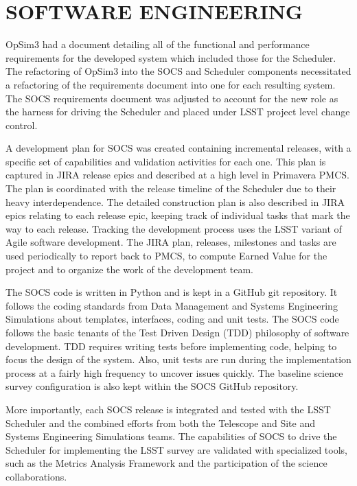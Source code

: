 \documentclass[]{spie}  %
\begin{document}
\section{SOFTWARE ENGINEERING}

OpSim3 had a document detailing all of the functional and performance requirements for the developed system which included those for the Scheduler. The refactoring of OpSim3 into the SOCS and Scheduler components necessitated a refactoring of the requirements document into one for each resulting system. The SOCS requirements document was adjusted to account for the new role as the harness for driving the Scheduler and placed under LSST project level change control.

A development plan for SOCS was created containing incremental releases, with a specific set of capabilities and validation activities for each one. This plan is captured in JIRA\cite{JIRA} release epics and described at a high level in Primavera\cite{Primavera} PMCS\cite{PMCS}. The plan is coordinated with the release timeline of the Scheduler due to their heavy interdependence. The detailed construction plan is also described in JIRA epics relating to each release epic, keeping track of individual tasks that mark the way to each release. Tracking the development process uses the LSST variant of Agile software development\cite{Kantor_SPIE2016}. The JIRA plan, releases, milestones and tasks are used periodically to report back to PMCS, to compute Earned Value for the project and to organize the work of the development team.

The SOCS code is written in Python\cite{Python} and is kept in a GitHub\cite{GitHub} git repository. It follows the coding standards from Data Management and Systems Engineering Simulations about templates, interfaces, coding and unit tests. The SOCS code follows the basic tenants of the Test Driven Design\cite{Beck2002}\cite{Astels2003} (TDD) philosophy of software development. TDD requires writing tests before implementing code, helping to focus the design of the system. Also, unit tests are run during the implementation process at a fairly high frequency to uncover issues quickly. The baseline science survey configuration is also kept within the SOCS GitHub repository. 

More importantly, each SOCS release is integrated and tested with the LSST Scheduler and the combined efforts from both the Telescope and Site and Systems Engineering Simulations teams. The capabilities of SOCS to drive the Scheduler for implementing the LSST survey are validated with specialized tools, such as the Metrics Analysis Framework\cite{2014SPIE.9149E..0BJ} and the participation of the science collaborations.
\end{document}
